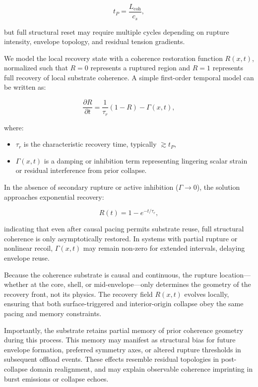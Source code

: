 \documentclass[entropy,article,submit,pdftex,moreauthors]{Definitions/mdpi}
\begin{document}
\begin{equation}
t_P = \frac{L_{\text{coh}}}{c_s},
\end{equation}

but full structural reset may require multiple cycles depending on rupture intensity, envelope topology, and residual tension gradients.

We model the local recovery state with a coherence restoration function $R(x,t)$, normalized such that $R = 0$ represents a ruptured region and $R = 1$ represents full recovery of local substrate coherence. A simple first-order temporal model can be written as:

\begin{equation}
\frac{\partial R}{\partial t} = \frac{1}{\tau_r} (1 - R) - \Gamma(x,t),
\end{equation}

where:
\begin{itemize}
  \item $\tau_r$ is the characteristic recovery time, typically $\gtrsim t_P$,
  \item $\Gamma(x,t)$ is a damping or inhibition term representing lingering scalar strain or residual interference from prior collapse.
\end{itemize}

In the absence of secondary rupture or active inhibition ($\Gamma \rightarrow 0$), the solution approaches exponential recovery:

\begin{equation}
R(t) = 1 - e^{-t/\tau_r},
\end{equation}

indicating that even after causal pacing permits substrate reuse, full structural coherence is only asymptotically restored. In systems with partial rupture or nonlinear recoil, $\Gamma(x,t)$ may remain non-zero for extended intervals, delaying envelope reuse.

Because the coherence substrate is causal and continuous, the rupture location—whether at the core, shell, or mid-envelope—only determines the geometry of the recovery front, not its physics. The recovery field $R(x,t)$ evolves locally, ensuring that both surface-triggered and interior-origin collapse obey the same pacing and memory constraints.

Importantly, the substrate retains partial memory of prior coherence geometry during this process. This memory may manifest as structural bias for future envelope formation, preferred symmetry axes, or altered rupture thresholds in subsequent offload events. These effects resemble residual topologies in post-collapse domain realignment, and may explain observable coherence imprinting in burst emissions or collapse echoes.
\end{document}

